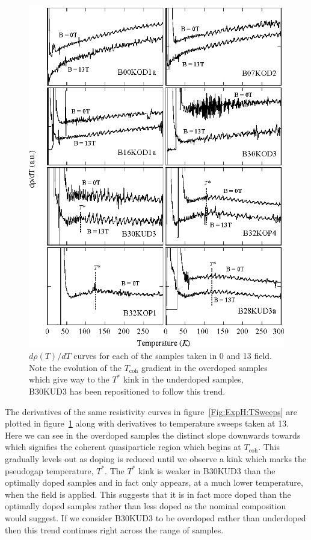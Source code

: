 \begin{figure}[htbp]
    \begin{center}
        \includegraphics[scale=0.9]{Chapter-HallBSCO/Figures/DRhoDtCurves/DRhoDtCurves}
        \caption{$d\rho(T)/dT$ curves for each of the samples taken in \unit{0}{\tesla} and \unit{13}{\tesla} field. Note the evolution of the $T_{\textrm{coh}}$ gradient in the overdoped samples which give way to the $T^*$ kink in the underdoped samples, B30KUD3 has been repositioned to follow this trend.}
        \label{Fig:ExpH:DRhoDtCurves}
    \end{center}
\end{figure}
The derivatives of the same resistivity curves in figure~\ref{Fig:ExpH:TSweeps} are plotted in figure~\ref{Fig:ExpH:DRhoDtCurves} along with derivatives to temperature sweeps taken at \unit{13}{\tesla}. Here we can see in the overdoped samples the distinct slope downwards towards \Tc which signifies the coherent quasiparticle region which begins at $T_{\textrm{coh}}$. This gradually levels out as doping is reduced until we observe a kink which marks the pseudogap temperature, $T^*$. The $T^*$ kink is weaker in B30KUD3 than the optimally doped samples and in fact only appears, at a much lower temperature, when the field is applied. This suggests that it is in fact more doped than the optimally doped samples rather than less doped as the nominal composition would suggest. If we consider B30KUD3 to be overdoped rather than underdoped then this trend continues right across the range of samples.

